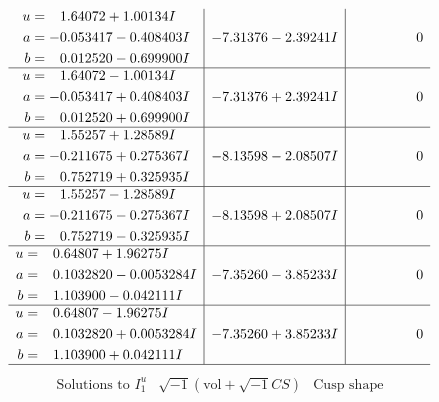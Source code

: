 \documentclass[1p]{elsarticle_modified}
\theoremstyle{definition}
\newcommand{\I}{\sqrt{-1}}
\begin{document}
$$\begin{array}{c|c|c}
\begin{aligned}
u &= \phantom{-}1.64072 + 1.00134 I \\
a &= -0.053417 - 0.408403 I \\
b &= \phantom{-}0.012520 - 0.699900 I\end{aligned}
 & -7.31376 - 2.39241 I & \phantom{-0.000000 } 0 \\ \hline\begin{aligned}
u &= \phantom{-}1.64072 - 1.00134 I \\
a &= -0.053417 + 0.408403 I \\
b &= \phantom{-}0.012520 + 0.699900 I\end{aligned}
 & -7.31376 + 2.39241 I & \phantom{-0.000000 } 0 \\ \hline\begin{aligned}
u &= \phantom{-}1.55257 + 1.28589 I \\
a &= -0.211675 + 0.275367 I \\
b &= \phantom{-}0.752719 + 0.325935 I\end{aligned}
 & -8.13598 - 2.08507 I & \phantom{-0.000000 } 0 \\ \hline\begin{aligned}
u &= \phantom{-}1.55257 - 1.28589 I \\
a &= -0.211675 - 0.275367 I \\
b &= \phantom{-}0.752719 - 0.325935 I\end{aligned}
 & -8.13598 + 2.08507 I & \phantom{-0.000000 } 0 \\ \hline\begin{aligned}
u &= \phantom{-}0.64807 + 1.96275 I \\
a &= \phantom{-}0.1032820 - 0.0053284 I \\
b &= \phantom{-}1.103900 - 0.042111 I\end{aligned}
 & -7.35260 - 3.85233 I & \phantom{-0.000000 } 0 \\ \hline\begin{aligned}
u &= \phantom{-}0.64807 - 1.96275 I \\
a &= \phantom{-}0.1032820 + 0.0053284 I \\
b &= \phantom{-}1.103900 + 0.042111 I\end{aligned}
 & -7.35260 + 3.85233 I & \phantom{-0.000000 } 0\\
 \hline 
 \end{array}$$\newpage$$\begin{array}{c|c|c}  
\text{Solutions to }I^u_{1}& \I (\text{vol} + \sqrt{-1}CS) & \text{Cusp shape}\\
 \hline 
\begin{aligned}

\end{aligned}
\end{array}$$
\end{document}
